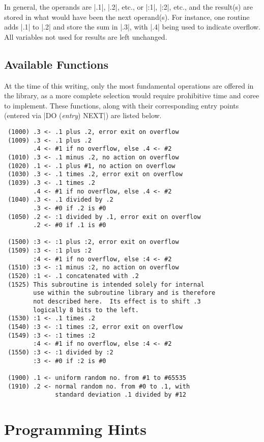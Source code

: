 In general, the operands are |.1|, |.2|, etc., or |:1|, |:2|, etc., and the
result(s) are stored in what would have been the next operand(s).  For
instance, one routine adds |.1| to |.2| and store the sum in |.3|, with
|.4| being used to indicate overflow.  All variables not used for results
are left unchanged.

\subsection{Available Functions}

At the time of this writing, only the most fundamental operations are
offered in the library, as a more complete selection would require
prohibitive time and coree to implement.  These functions, along with their
corresponding entry points (entered via |DO ({\em entry}) NEXT|) are listed
below.

\begin{verbatim}
 (1000) .3 <- .1 plus .2, error exit on overflow
 (1009) .3 <- .1 plus .2
        .4 <- #1 if no overflow, else .4 <- #2
 (1010) .3 <- .1 minus .2, no action on overflow
 (1020) .1 <- .1 plus #1, no action on overflow
 (1030) .3 <- .1 times .2, error exit on overflow
 (1039) .3 <- .1 times .2
        .4 <- #1 if no overflow, else .4 <- #2
 (1040) .3 <- .1 divided by .2
        .3 <- #0 if .2 is #0
 (1050) .2 <- :1 divided by .1, error exit on overflow
        .2 <- #0 if .1 is #0

 (1500) :3 <- :1 plus :2, error exit on overflow
 (1509) :3 <- :1 plus :2
        :4 <- #1 if no overflow, else :4 <- #2
 (1510) :3 <- :1 minus :2, no action on overflow
 (1520) :1 <- .1 concatenated with .2
 (1525) This subroutine is intended solely for internal
        use within the subroutine library and is therefore
        not described here.  Its effect is to shift .3
        logically 8 bits to the left.
 (1530) :1 <- .1 times .2
 (1540) :3 <- :1 times :2, error exit on overflow
 (1549) :3 <- :1 times :2
        :4 <- #1 if no overflow, else :4 <- #2
 (1550) :3 <- :1 divided by :2
        :3 <- #0 if :2 is #0

 (1900) .1 <- uniform random no. from #1 to #65535
 (1910) .2 <- normal random no. from #0 to .1, with
              standard deviation .1 divided by #12
\end{verbatim}







\section{Programming Hints}

